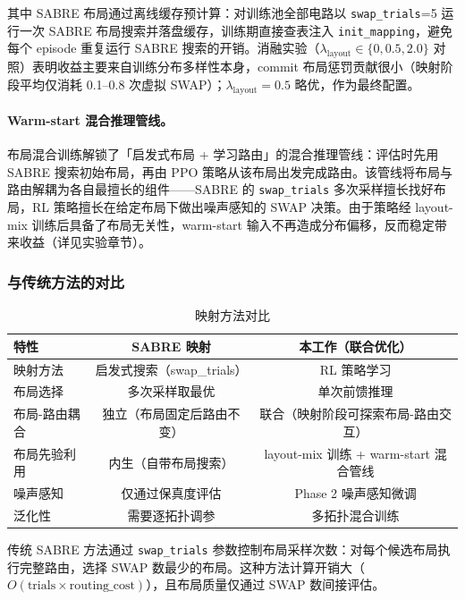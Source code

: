 其中 SABRE 布局通过离线缓存预计算：对训练池全部电路以 \texttt{swap\_trials}=5 运行一次 SABRE 布局搜索并落盘缓存，训练期直接查表注入 \texttt{init\_mapping}，避免每个 episode 重复运行 SABRE 搜索的开销。消融实验（$\lambda_{\text{layout}} \in \{0, 0.5, 2.0\}$ 对照）表明收益主要来自训练分布多样性本身，commit 布局惩罚贡献很小（映射阶段平均仅消耗 0.1--0.8 次虚拟 SWAP）；$\lambda_{\text{layout}} = 0.5$ 略优，作为最终配置。

\paragraph{Warm-start 混合推理管线。} 布局混合训练解锁了「启发式布局 + 学习路由」的混合推理管线：评估时先用 SABRE 搜索初始布局，再由 PPO 策略从该布局出发完成路由。该管线将布局与路由解耦为各自最擅长的组件——SABRE 的 \texttt{swap\_trials} 多次采样擅长找好布局，RL 策略擅长在给定布局下做出噪声感知的 SWAP 决策。由于策略经 layout-mix 训练后具备了布局无关性，warm-start 输入不再造成分布偏移，反而稳定带来收益（详见实验章节）。

\subsubsection{与传统方法的对比}

\begin{table}[htbp]
\centering
\caption{映射方法对比}
\label{tab:mapping-comparison}
\small
\begin{tabular}{l|cc}
\hline
特性 & SABRE 映射 & 本工作（联合优化） \\
\hline
映射方法 & 启发式搜索（swap\_trials） & RL 策略学习 \\
布局选择 & 多次采样取最优 & 单次前馈推理 \\
布局-路由耦合 & 独立（布局固定后路由不变） & 联合（映射阶段可探索布局-路由交互） \\
布局先验利用 & 内生（自带布局搜索） & layout-mix 训练 + warm-start 混合管线 \\
噪声感知 & 仅通过保真度评估 & Phase 2 噪声感知微调 \\
泛化性 & 需要逐拓扑调参 & 多拓扑混合训练 \\
\hline
\end{tabular}
\end{table}

传统 SABRE 方法通过 \texttt{swap\_trials} 参数控制布局采样次数：对每个候选布局执行完整路由，选择 SWAP 数最少的布局。这种方法计算开销大（$O(\text{trials} \times \text{routing\_cost})$），且布局质量仅通过 SWAP 数间接评估。

